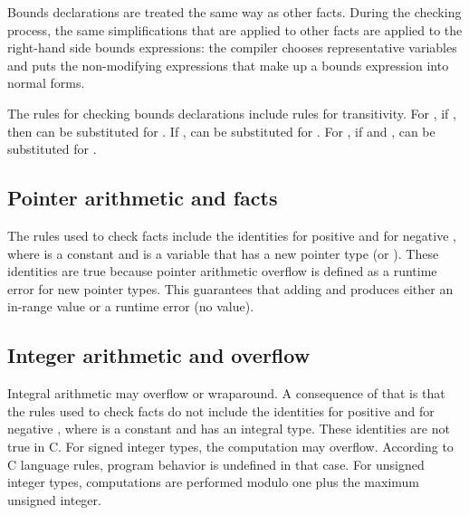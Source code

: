 Bounds declarations are treated the same way as other facts. During the
checking process, the same simplifications that are applied to other
facts are applied to the right-hand side bounds expressions: the
compiler chooses representative variables and puts the non-modifying
expressions that make up a bounds expression into normal forms.

The rules for checking bounds declarations include rules for
transitivity. For , if
 \code{<=} , then  can
be substituted for . 
If  \code{<=} ,  can be substituted for
.  For , if
 \code{<=}  and  ,
 can be substituted for .

\subsection{Pointer arithmetic and facts}

The rules used to check facts include the identities  \code{<}  \code{+} 
for positive  and  \code{+}  \code{<}  for
negative , where  is a
constant and  is a variable that has a new pointer type (\ptr or \arrayptr).
These identities are true
because pointer arithmetic overflow is defined as a runtime error for
new pointer types. This guarantees that adding  and  produces either
an in-range value or a runtime error (no value).

\subsection{Integer arithmetic and overflow}
\label{section:where-clauses-and-overflow}

Integral arithmetic may overflow or wraparound. A consequence of that is
that the rules used to check facts do not include the identities 
 \code{<}  \code{+}  
for positive  and  \code{+}  \code{<}  for 
negative , where  is a
constant and  has an integral type. These identities are not true in C.  For signed integer types, the computation  \code{+} 
may overflow.   According to C language
rules, program behavior is undefined in that case.  For unsigned
integer types, computations are performed modulo one plus
the maximum unsigned integer.

